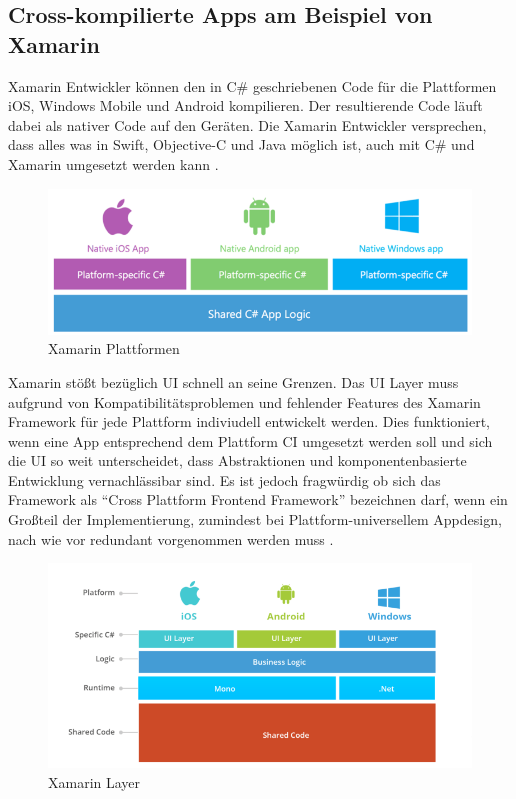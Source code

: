 \subsection{Cross-kompilierte Apps am Beispiel von Xamarin}

Xamarin Entwickler können den in C\# geschriebenen Code für die Plattformen iOS, Windows Mobile und Android kompilieren.
Der resultierende Code läuft dabei als nativer Code auf den Geräten.
Die Xamarin Entwickler versprechen, dass alles was in Swift, Objective-C und
Java möglich ist, auch mit C\# und Xamarin umgesetzt werden kann \cite{projectxamarin}.

\begin{figure}[ht]
 \centering
 \includegraphics[width=0.8\linewidth]{kapitel2/csharp_xamarin.png}
 \caption{Xamarin Plattformen \cite{7Reas20:online}}
\end{figure}
\vspace{1cm}

\noindent
Xamarin stößt bezüglich \ac{UI} schnell an seine Grenzen. Das \ac{UI} Layer muss aufgrund von Kompatibilitätsproblemen und fehlender Features des Xamarin Framework
für jede Plattform indiviudell entwickelt werden. Dies funktioniert, wenn eine App entsprechend dem Plattform CI umgesetzt werden soll und sich die \ac{UI} so weit unterscheidet,
dass Abstraktionen und komponentenbasierte Entwicklung vernachlässibar sind. Es ist jedoch fragwürdig ob sich das Framework als ``Cross Plattform Frontend Framework'' bezeichnen darf,
wenn ein Großteil der Implementierung, zumindest bei Plattform-universellem Appdesign, nach wie vor redundant vorgenommen werden muss \cite{7Reas20:online}.

\begin{figure}[ht]
 \centering
 \includegraphics[width=0.8\linewidth]{kapitel2/xamarin_ui_blocker.png}
 \caption{Xamarin Layer \cite{7Reas20:online}}
\end{figure}

